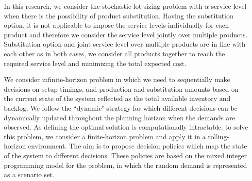 \documentclass[10pt]{article}
\begin{document}
In this research, we consider the stochastic lot sizing problem with $\alpha$ service level when there is the possibility of product substitution. Having the substitution option, it is not applicable to impose the service levels individually for each product and therefore we consider the service level jointly over multiple products. Substitution option and joint service level over multiple products are in line with each other as in both cases, we consider all products together to reach the required service level and minimizing the total expected cost. 



We consider infinite-horizon problem in which we need to sequentially make decisions on setup timings, and production and substitution amounts based on the current state of the system reflected as the total available inventory and backlog. We follow the ``dynamic" strategy \cite{bookbinder1988strategies} for which different decisions can be dynamically updated throughout the planning horizon when the demands are observed. As defining the optimal solution is computationally intractable, to solve this problem, we consider a finite-horizon problem and apply it in a rolling-horizon environment. The aim is to propose decision policies which map the state of the system to different decisions. These policies are based on the mixed integer programming model for the problem, in which the random demand is represented as a scenario set.
\end{document}
